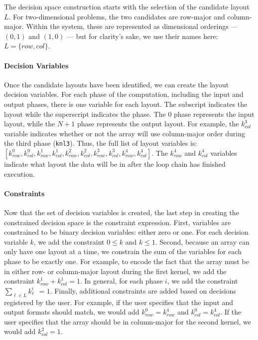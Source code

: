 The decision space construction starts with the selection of the candidate layout $L$.
For two-dimensional problems, the two candidates are row-major and column-major.
Within the system, these are represented as dimensional orderings --- $(0,1)$ and $(1,0)$ --- but for clarity's sake, we use their names here: $L=\{row,col\}$.

\paragraph{Decision Variables}
Once the candidate layouts have been identified, we can create the layout decision variables.
For each phase of the computation, including the input and output phases, there is one variable for each layout.
The subscript indicates the layout while the superscript indicates the phase. 
The 0 phase represents the input layout, while the $N+1$ phase represents the output layout.
For example, the $k_{col}^{3}$ variable indicates whether or not the array will use column-major order during the third phase (\verb.knl3.).
Thus, the full list of layout variables is: $[k_{row}^{0}, k_{col}^{0}, k_{row}^{1}, k_{col}^{1},k_{row}^{2}, k_{col}^{2},k_{row}^{3}, k_{col}^{3},k_{row}^{4}, k_{col}^{4}]$.
The $k_{row}^4$ and $k_{col}^4$ variables indicate what layout the data will be in after the loop chain has finished execution.

\paragraph{Constraints}
Now that the set of decision variables is created, the last step in creating the constrained decision space is the constraint expression. 
First, variables are constrained to be binary decision variables: either zero or one. 
For each decision variable $k$, we add the constraint $0 \leq k$ and $k \leq 1$.
Second, because an array can only have one layout at a time, we constrain the sum of the variables for each phase to be exactly one.
For example, to encode the fact that the array must be in either row- or column-major layout during the first kernel, we add the constraint $k_{row}^1 + k_{col}^1 = 1$.
In general, for each phase $i$, we add the constraint $\sum_{\ell \in L} k_\ell^{i} \ \ = 1$.
Finally, additional constraints are added based on decisions registered by the user.
For example, if the user specifies that the input and output formats should match, we would add $k_{row}^0 = k_{row}^4$ and  $k_{col}^0 = k_{col}^4$.
If the user specifies that the array should be in column-major for the second kernel, we would add $k_{col}^2 = 1$.

